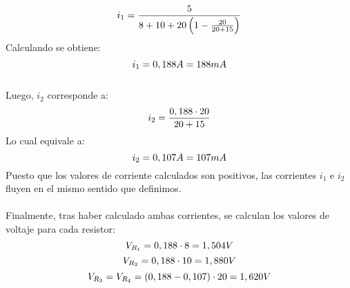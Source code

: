 \begin{example}
        \begin{equation*}
        \notag i_1=\frac{5}{8+10+20\left(1-\frac{20}{20+15}\right)}
        \end{equation*}Calculando se obtiene:
        \begin{equation*}
        \notag i_1 = 0,188A = 188mA
        \end{equation*}\\Luego, $i_2$ corresponde a:
        \begin{equation*}
        \notag i_2 = \frac{0,188 \cdot 20}{20+15}
        \end{equation*}
        Lo cual equivale a:
        \begin{equation*}
        \notag i_2 = 0,107 A=107mA
        \end{equation*}
        Puesto que los valores de corriente calculados son positivos, las corrientes $i_1$ e $i_2$ fluyen en el mismo sentido que definimos.\\\\
        Finalmente, tras haber calculado ambas corrientes, se calculan los valores de voltaje para cada resistor:
        \begin{equation*}
        \notag V_{R_1}=0,188\cdot8 = 1,504 V
        \end{equation*}
        \begin{equation*}
        \notag V_{R_2} = 0,188 \cdot10 = 1,880 V
        \end{equation*}
        \begin{equation*}
        \notag V_{R_3} = V_{R_4} = (0,188-0,107) \cdot 20 = 1,620 V
        \end{equation*}




    \end{example}

